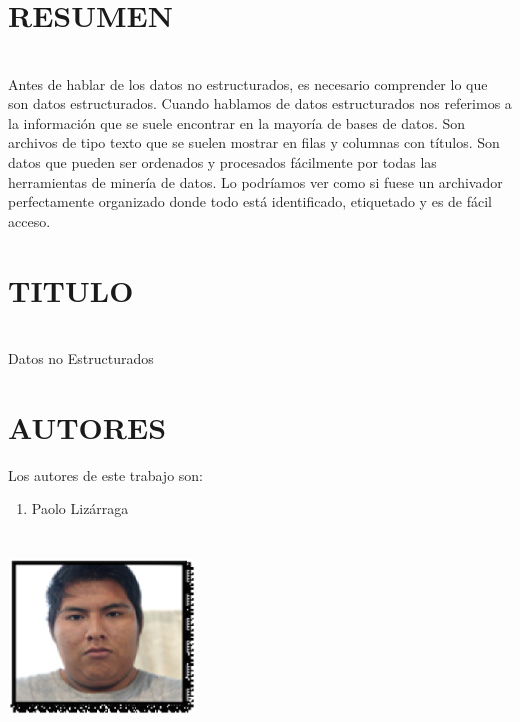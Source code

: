 \documentclass{article} %
\begin{document}
\noindent 


\section{ RESUMEN}

\noindent 
\section{}

\noindent Antes de hablar de los datos no estructurados, es necesario comprender lo que son datos estructurados. Cuando hablamos de datos estructurados nos referimos a la informaci\'{o}n que se suele encontrar en la mayor\'{i}a de bases de datos. Son archivos de tipo texto que se suelen mostrar en filas y columnas con t\'{i}tulos. Son datos que pueden ser ordenados y procesados f\'{a}cilmente por todas las herramientas de miner\'{i}a de datos. Lo podr\'{i}amos ver como si fuese un archivador perfectamente organizado donde todo est\'{a} identificado, etiquetado y es de f\'{a}cil acceso.

\noindent 


\section{ TITULO}

\noindent 
\section{}

\noindent                 Datos no Estructurados

\noindent 


\section{ AUTORES}

\noindent 

\noindent Los autores de este trabajo son:

\noindent 

\begin{enumerate}
\item  Paolo Liz\'{a}rraga
\end{enumerate}

\noindent 
\section{\includegraphics*[width=1.95in, height=1.63in, keepaspectratio=false]{image1}}
\end{document}
